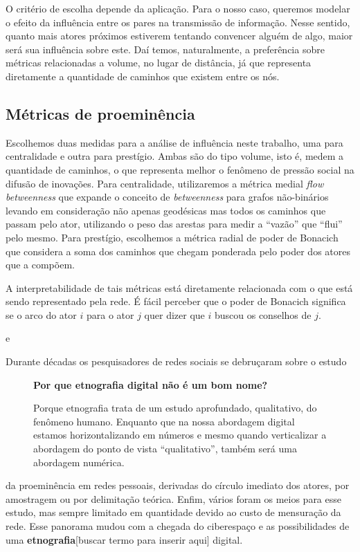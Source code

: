 \documentclass{article}
\begin{document}
O critério de escolha depende da aplicação. Para o nosso caso, queremos modelar
o efeito da influência entre os pares na transmissão de informação. Nesse
sentido, quanto mais atores próximos estiverem tentando convencer alguém de
algo, maior será sua influência sobre este. Daí temos, naturalmente, a
preferência sobre métricas relacionadas a volume, no lugar de distância, já que
representa diretamente a quantidade de caminhos que existem entre os nós.

\subsection{Métricas de proeminência}

Escolhemos duas medidas para a análise de influência neste trabalho, uma para
centralidade e outra para prestígio. Ambas são do tipo volume, isto é, medem a
quantidade de caminhos, o que representa melhor o fenômeno de pressão social na
difusão de inovações. Para centralidade, utilizaremos a métrica medial
\textit{flow betweenness} que expande o conceito de \textit{betweenness} para
grafos não-binários \cite{Freeman1991} levando em consideração não apenas
geodésicas mas todos os caminhos que passam pelo ator, utilizando o peso das
arestas para medir a ``vazão'' que ``flui'' pelo mesmo. Para prestígio,
escolhemos a métrica radial de poder de Bonacich \cite{Bonacich1987} que
considera a soma dos caminhos que chegam ponderada pelo poder dos atores que a
compõem.

A interpretabilidade de tais métricas está diretamente relacionada com o que está
sendo representado pela rede. É fácil perceber que o poder de Bonacich significa
se o arco do ator $i$ para o ator $j$ quer dizer que $i$ buscou os conselhos de
$j$. 


\cite{Richardson2002} e \cite{Domingos2001}

Durante décadas os pesquisadores de redes sociais se debruçaram sobre o estudo
\begin{figure}
\begin{boxedminipage}{2in}
\textbf{\large{Por que etnografia digital não é um bom nome?}}
\normalsize{}

Porque etnografia trata de um estudo aprofundado, qualitativo, do fenômeno
humano. Enquanto que na nossa abordagem digital estamos horizontalizando em
números e mesmo quando verticalizar a abordagem do ponto de vista
``qualitativo'', também será uma abordagem numérica.
\end{boxedminipage}
\end{figure} da proeminência em redes pessoais, derivadas do círculo
imediato dos atores, por amostragem ou por delimitação teórica. Enfim, vários foram os meios para esse
estudo, mas sempre limitado em quantidade devido ao custo de mensuração da rede.
Esse panorama mudou com a chegada do ciberespaço e as possibilidades de uma
\textbf{etnografia}[buscar termo para inserir aqui] digital. 
\end{document}
